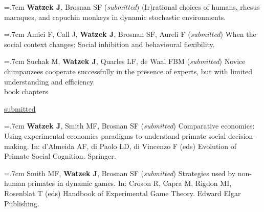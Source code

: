 \documentclass[]{friggeri-cv}
\begin{document}
\hangindent=.7cm \textbf{Watzek J}, Brosnan SF (\emph{submitted}) (Ir)rational choices of humans, rhesus macaques, and capuchin monkeys in dynamic stochastic environments.

\hangindent=.7cm Amici F, Call J, \textbf{Watzek J}, Brosnan SF, Aureli F (\emph{submitted}) When the social context changes: Social inhibition and behavioural flexibility.

\hangindent=.7cm Suchak M, \textbf{Watzek J}, Quarles LF, de Waal FBM (\emph{submitted}) Novice chimpanzees cooperate successfully in the presence of experts, but with limited understanding and efficiency. \\[.5cm]





{\subfont\large{} book chapters}


\hspace{.35cm} { \underline{submitted}}

\hangindent=.7cm \textbf{Watzek J}, Smith MF, Brosnan SF (\emph{submitted}) Comparative economics: Using experimental economics paradigms to understand primate social decision-making. In: d'Almeida AF, di Paolo LD, di Vincenzo F (eds) Evolution of Primate Social Cognition. Springer.


\newpage
\thispagestyle{fancy}

\hangindent=.7cm Smith MF, \textbf{Watzek J}, Brosnan SF (\emph{submitted}) Strategies used by non-human primates in dynamic games. In: Croson R, Capra M, Rigdon MI, Rosenblat T (eds) Handbook of Experimental Game Theory. Edward Elgar Publishing.\\[.4cm]

\renewenvironment{aside}{%
  \let\oldsection\section
  \renewcommand{\section}[1]{
    \par\vspace{\baselineskip}{\Large\headingfont\color{headercolor} ##1}
  }
  \begin{textblock}{3.6}(1.5, 1.5)
  \begin{flushright}
  \obeycr
}{%
  \restorecr
  \end{flushright}
  \end{textblock}
  \let\section\oldsection
}
\end{document}
